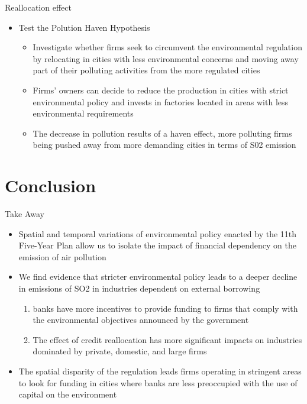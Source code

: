 \documentclass{beamer}
\begin{document}
\begin{frame}{Reallocation effect}

    \begin{itemize}
        \item Test the Polution Haven Hypothesis
        \begin{itemize}
            \item Investigate whether firms seek to circumvent the environmental regulation by relocating in cities with less environmental concerns and moving away part of their polluting activities from the more regulated cities
            \item Firms’ owners can decide to reduce the production in cities with strict environmental policy and invests in factories located in areas with less environmental requirements
            \item The decrease in pollution results of a haven effect, more polluting firms being pushed away from more demanding cities in terms of S02 emission
        \end{itemize}
    \end{itemize}
\end{frame}

\section{Conclusion}

\begin{frame}{Take Away}
    \begin{itemize}
        \item Spatial and temporal variations of environmental policy enacted by the 11th Five-Year Plan allow us to isolate the impact of financial dependency on the emission of air pollution
        \item We find evidence that stricter environmental policy leads to a deeper decline in emissions of SO2 in industries dependent on external borrowing
        \begin{enumerate}
            \item banks have more incentives to provide funding to firms that comply with the environmental objectives announced by the government
            \item  The effect of credit reallocation has more significant impacts on industries dominated by private, domestic, and large firms
        \end{enumerate}
        \item The spatial disparity of the regulation leads firms operating in stringent areas to look for funding in cities where banks are less preoccupied with the use of capital on the environment
    \end{itemize}
    
\end{frame}
\end{document}
